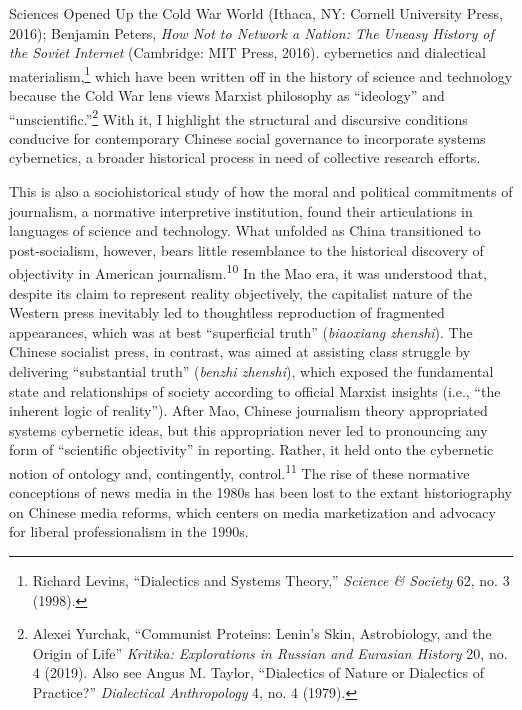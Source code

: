 \documentclass{tufte-handout}
\begin{document}
\begin{CJK*}{UTF8}{gbsn}
{{  Sciences Opened Up the Cold War World} (Ithaca, NY: Cornell University
  Press, 2016); Benjamin Peters, \emph{How Not to Network a Nation: The
  Uneasy History of the Soviet Internet} (Cambridge: MIT Press, 2016).} cybernetics and dialectical materialism,\footnote{Richard
  Levins, ``Dialectics and Systems Theory,'' \emph{Science \& Society}
  62, no. 3 (1998).} which have been written off in the history of
science and technology because the Cold War lens views Marxist
philosophy as ``ideology'' and ``unscientific.''\footnote{Alexei
  Yurchak, ``Communist Proteins: Lenin's Skin, Astrobiology, and the
  Origin of Life'' \emph{Kritika: Explorations in Russian and Eurasian
  History} 20, no. 4 (2019). Also see Angus M. Taylor, ``Dialectics of
  Nature or Dialectics of Practice?'' \emph{Dialectical Anthropology} 4,
  no. 4 (1979).} With it, I highlight the structural and discursive
conditions conducive for contemporary Chinese social governance to
incorporate systems cybernetics, a broader historical process in need of
collective research efforts.

\end{CJK*}


This is also a sociohistorical study of how the moral and political
commitments of journalism, a normative interpretive institution, found
their articulations in languages of science and technology. What
unfolded as China transitioned to post-socialism, however, bears little
resemblance to the historical discovery of objectivity in American
journalism.\textsuperscript{10}
In the Mao era, it was understood that, despite its claim to represent
reality objectively, the capitalist nature of the Western press
inevitably led to thoughtless reproduction of fragmented appearances,
which was at best ``superficial truth'' (\emph{biaoxiang zhenshi}). The
Chinese socialist press, in contrast, was aimed at assisting class
struggle by delivering ``substantial truth'' (\emph{benzhi zhenshi}),
which exposed the fundamental state and relationships of society
according to official Marxist insights (i.e., ``the inherent logic of
reality''). After Mao, Chinese journalism theory appropriated systems
cybernetic ideas, but this appropriation never led to pronouncing any
form of ``scientific objectivity'' in reporting. Rather, it held onto
the cybernetic notion of ontology and, contingently, control.\textsuperscript{11} The
rise of these normative conceptions of news media in the 1980s has been
lost to the extant historiography on Chinese media reforms, which
centers on media marketization and advocacy for liberal professionalism
in the 1990s.
\end{document}
